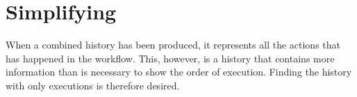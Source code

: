 	\section{Simplifying}
	When a combined history has been produced, it represents all the actions that has happened in the workflow. This, however, is a history that contains more information than is necessary to show the order of execution. Finding the history with only executions is therefore desired.
	
	
	
	


